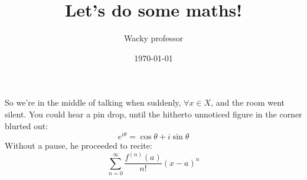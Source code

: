 \documentclass[a4paper,11pt]{article}
\title{Let's do some maths!}
\author{Wacky professor}
\date{\today}
\begin{document}
\maketitle
So we're in the middle of talking when suddenly, $\forall x \in X$, and the room went silent. You could hear a pin drop, until the hitherto unnoticed figure in the corner blurted out:
\begin{equation}
e^{i\theta}= \cos\theta + i\sin\theta
\end{equation}
Without a pause, he proceeded to recite:
\begin{equation}
\sum_{n=0}^{\infty}\frac{f^{(n)}(a)}{n!}(x-a)^{n}
\end{equation}
\end{document}
